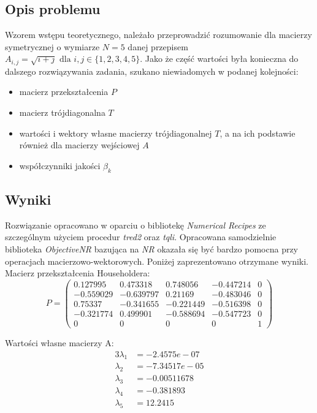 \subsection{Opis problemu}

Wzorem wstępu teoretycznego, należało przeprowadzić rozumowanie dla macierzy symetrycznej o wymiarze $ N = 5 $ danej przepisem $ A_{i,j} = \sqrt{i + j} \text{ dla } i,j \in \{1, 2, 3, 4, 5\} $. Jako że część wartości była konieczna do dalszego rozwiązywania zadania, szukano niewiadomych w podanej kolejności: 
\begin{itemize}
	\item macierz przekształcenia $ P $
	\item macierz trójdiagonalna $ T $
	\item wartości i wektory własne macierzy trójdiagonalnej $ T $, a na ich podstawie również dla macierzy wejściowej $ A $
	\item współczynniki jakości $ \beta_k $
\end{itemize}

\subsection{Wyniki}

Rozwiązanie opracowano w oparciu o bibliotekę\textit{ Numerical Recipes} ze szczególnym użyciem procedur \textit{tred2} oraz \textit{tqli}. Opracowana samodzielnie biblioteka \textit{ObjectiveNR} bazująca na \textit{NR} okazała się być bardzo pomocna przy operacjach macierzowo-wektorowych. Poniżej zaprezentowano otrzymane wyniki. \\

Macierz przekształcenia Householdera:
\begin{equation*}
P = 
\begin{pmatrix}
0.127995 &0.473318 &0.748056 &-0.447214 &0 \\ 
-0.559029 &-0.639797& 0.21169 &-0.483046 &0 \\
0.75337 &-0.341655 &-0.221449 &-0.516398 &0 \\
-0.321774& 0.499901& -0.588694& -0.547723& 0 \\
0& 0& 0& 0& 1 
\end{pmatrix}
\end{equation*}

Wartości własne macierzy A:
\begin{alignat*}{3}
\lambda_1 &= -2.4575e-07 \\
\lambda_2 &= -7.34517e-05 \\ 
\lambda_3 &= -0.00511678 \\
\lambda_4 &= -0.381893 \\
\lambda_5 &= 12.2415
\end{alignat*}

